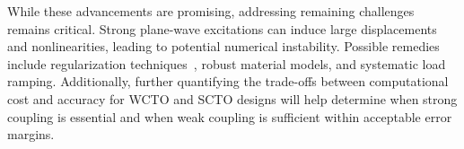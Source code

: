        While these advancements are promising, addressing remaining challenges remains critical. Strong plane-wave excitations can induce large displacements and nonlinearities, 
       leading to potential numerical instability. Possible remedies include regularization techniques~\cite{HuHu0}, 
       robust material models, and systematic load ramping. Additionally, further quantifying the trade-offs between
        computational cost and accuracy for WCTO and SCTO designs will help determine when strong coupling is essential
         and when weak coupling is sufficient within acceptable error margins.
